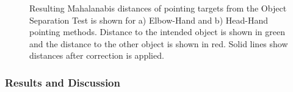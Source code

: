 \begin{figure}[ht!]
\centering
%
    \caption{%
	Resulting Mahalanabis distances of pointing targets from the Object Separation Test is shown for a) Elbow-Hand and b) Head-Hand pointing methods. Distance to the intended object is shown in green and the distance to the other object is shown in red. Solid lines show distances after correction is applied.
     }%
   \label{fig:pointing_graphs}
\end{figure}

\subsubsection{Results and Discussion}
\label{sec:results_and_discussion}

